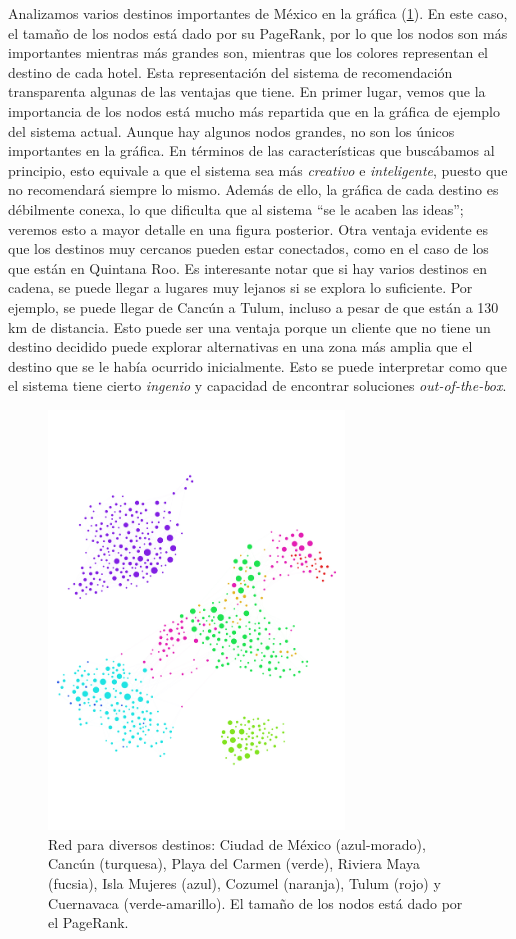 \documentclass[12pt]{report}
\begin{document}
Analizamos varios destinos importantes de México en la gráfica (\ref{fig:destinos}). En este caso, el tamaño de los nodos está dado por su PageRank, por lo que los nodos son más importantes mientras más grandes son, mientras que los colores representan el destino de cada hotel. Esta representación del sistema de recomendación transparenta algunas de las ventajas que tiene. En primer lugar, vemos que la importancia de los nodos está mucho más repartida que en la gráfica de ejemplo del sistema actual. Aunque hay algunos nodos grandes, no son los únicos importantes en la gráfica. En términos de las características que buscábamos al principio, esto equivale a que el sistema sea más \emph{creativo} e \emph{inteligente}, puesto que no recomendará siempre lo mismo. Además de ello, la gráfica de cada destino es débilmente conexa, lo que dificulta que al sistema ``se le acaben las ideas''; veremos esto a mayor detalle en una figura posterior. Otra ventaja evidente es que los destinos muy cercanos pueden estar conectados, como en el caso de los que están en Quintana Roo. Es interesante notar que si hay varios destinos en cadena, se puede llegar a lugares muy lejanos si se explora lo suficiente. Por ejemplo, se puede llegar de Cancún a Tulum, incluso a pesar de que están a 130 km de distancia. Esto puede ser una ventaja porque un cliente que no tiene un destino decidido puede explorar alternativas en una zona más amplia que el destino que se le había ocurrido inicialmente. Esto se puede interpretar como que el sistema tiene cierto \emph{ingenio} y capacidad de encontrar soluciones \emph{out-of-the-box}.
\begin{figure}[ht]
	\centering
	\includegraphics[width=0.7\textwidth,
		trim = 0 300 0 300, clip]{imagenes/destinos2.png}
	\caption{\label{fig:destinos} Red para diversos destinos: Ciudad de México (azul-morado), Cancún (turquesa), Playa del Carmen (verde), Riviera Maya (fucsia), Isla Mujeres (azul), Cozumel (naranja), Tulum (rojo) y Cuernavaca (verde-amarillo). El tamaño de los nodos está dado por el PageRank.}
\end{figure}
\end{document}
